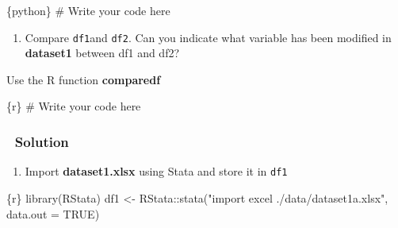 \documentclass[
  letterpaper,
  DIV=11,
  numbers=noendperiod,
  oneside]{scrreprt}
\newenvironment{Shaded}{\begin{snugshade}}{\end{snugshade}}
\newcommand{\AttributeTok}[1]{\textcolor[rgb]{0.40,0.45,0.13}{#1}}
\newcommand{\CommentTok}[1]{\textcolor[rgb]{0.37,0.37,0.37}{#1}}
\newcommand{\ConstantTok}[1]{\textcolor[rgb]{0.56,0.35,0.01}{#1}}
\newcommand{\FunctionTok}[1]{\textcolor[rgb]{0.28,0.35,0.67}{#1}}
\newcommand{\InformationTok}[1]{\textcolor[rgb]{0.37,0.37,0.37}{#1}}
\newcommand{\NormalTok}[1]{\textcolor[rgb]{0.00,0.23,0.31}{#1}}
\newcommand{\OtherTok}[1]{\textcolor[rgb]{0.00,0.23,0.31}{#1}}
\newcommand{\SpecialCharTok}[1]{\textcolor[rgb]{0.37,0.37,0.37}{#1}}
\newcommand{\StringTok}[1]{\textcolor[rgb]{0.13,0.47,0.30}{#1}}
\providecommand{\tightlist}{%
  \setlength{\itemsep}{0pt}\setlength{\parskip}{0pt}}\usepackage{longtable,booktabs,array}
\begin{document}
\begin{Shaded}
\begin{Highlighting}[]
\InformationTok{\textasciigrave{}\textasciigrave{}\textasciigrave{}\{python\}}
\CommentTok{\# Write your code here}
\InformationTok{\textasciigrave{}\textasciigrave{}\textasciigrave{}}
\end{Highlighting}
\end{Shaded}

\begin{enumerate}
\def\labelenumi{\arabic{enumi}.}
\setcounter{enumi}{2}
\tightlist
\item
  Compare \texttt{df1}and \texttt{df2}. Can you indicate what variable
  has been modified in \textbf{dataset1} between df1 and df2?
\end{enumerate}

\begin{tcolorbox}[enhanced jigsaw, colbacktitle=quarto-callout-tip-color!10!white, titlerule=0mm, breakable, opacityback=0, opacitybacktitle=0.6, left=2mm, coltitle=black, colback=white, title=\textcolor{quarto-callout-tip-color}{\faLightbulb}\hspace{0.5em}{Tip}, rightrule=.15mm, colframe=quarto-callout-tip-color-frame, toprule=.15mm, bottomtitle=1mm, toptitle=1mm, arc=.35mm, bottomrule=.15mm, leftrule=.75mm]
Use the R function \textbf{comparedf}
\end{tcolorbox}

\begin{Shaded}
\begin{Highlighting}[]
\InformationTok{\textasciigrave{}\textasciigrave{}\textasciigrave{}\{r\}}
\CommentTok{\# Write your code here}
\InformationTok{\textasciigrave{}\textasciigrave{}\textasciigrave{}}
\end{Highlighting}
\end{Shaded}

\hypertarget{solution-1}{%
\subsubsection{\texorpdfstring{{👀}
Solution}{👀 Solution}}\label{solution-1}}

\begin{enumerate}
\def\labelenumi{\arabic{enumi}.}
\tightlist
\item
  Import \textbf{dataset1.xlsx} using Stata and store it in \texttt{df1}
\end{enumerate}

\begin{Shaded}
\begin{Highlighting}[]
\InformationTok{\textasciigrave{}\textasciigrave{}\textasciigrave{}\{r\}}
\FunctionTok{library}\NormalTok{(RStata)}
\NormalTok{df1 }\OtherTok{\textless{}{-}}\NormalTok{ RStata}\SpecialCharTok{::}\FunctionTok{stata}\NormalTok{(}\StringTok{"import excel ./data/dataset1a.xlsx"}\NormalTok{,}
                     \AttributeTok{data.out =} \ConstantTok{TRUE}\NormalTok{)}
\InformationTok{\textasciigrave{}\textasciigrave{}\textasciigrave{}}
\end{Highlighting}
\end{Shaded}
\end{document}
